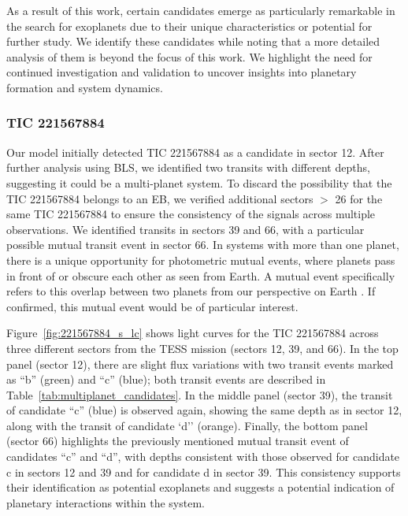 As a result of this work, certain candidates emerge as particularly remarkable in the search for exoplanets due to their unique characteristics or potential for further study. We identify these candidates while noting that a more detailed analysis of them is beyond the focus of this work. We highlight the need for continued investigation and validation to uncover insights into planetary formation and system dynamics. \par

\subsubsection{TIC 221567884}
Our model initially detected TIC 221567884  as a candidate in sector 12. After further analysis using BLS, we identified two transits with different depths, suggesting it could be a multi-planet system. To discard the possibility that the TIC 221567884 belongs to an EB, we verified additional sectors $>$ 26 for the same TIC 221567884 to ensure the consistency of the signals across multiple observations. We identified transits in sectors 39 and 66, with a particular possible mutual transit event in sector 66. In systems with more than one planet, there is a unique opportunity for photometric mutual events, where planets pass in front of or obscure each other as seen from Earth. A mutual event specifically refers to this overlap between two planets from our perspective on Earth \citep{ragozzine2010value}. If confirmed, this mutual event would be of particular interest. \par

Figure~\ref{fig:221567884_s_lc} shows light curves for the TIC 221567884 across three different sectors from the TESS mission (sectors 12, 39, and 66). In the top panel (sector 12), there are slight flux variations with two transit events marked as ``b'' (green) and ``c'' (blue); both transit events are described in Table~\ref{tab:multiplanet_candidates}. In the middle panel (sector 39), the transit of candidate ``c'' (blue) is observed again, showing the same depth as in sector 12, along with the transit of candidate `d'' (orange). Finally, the bottom panel (sector 66) highlights the previously mentioned mutual transit event of candidates ``c'' and ``d'', with depths consistent with those observed for candidate c in sectors 12 and 39 and for candidate d in sector 39. This consistency supports their identification as potential exoplanets and suggests a potential indication of planetary interactions within the system.  \par


